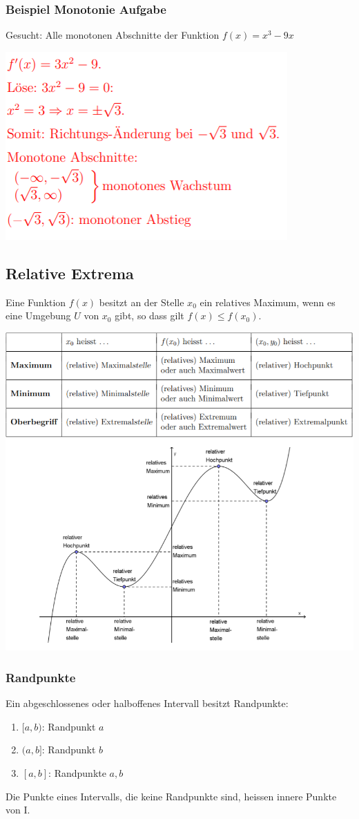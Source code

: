 \subsubsection{Beispiel Monotonie Aufgabe}
Gesucht: Alle monotonen Abschnitte der Funktion $f(x) = x^3 - 9x$
\begin{center}
    \includegraphics[width=0.4\linewidth]{images/monotonie.png}
\end{center}

\subsection{Relative Extrema}
Eine Funktion $f(x)$ besitzt an der Stelle $x_0$ ein relatives Maximum, wenn es eine Umgebung $U$ von $x_0$ gibt, so dass gilt $f(x) \leq f(x_0)$.

\begin{center}
    \includegraphics[width=1\linewidth]{images/rel.png}
\end{center}

\subsubsection{Randpunkte}
Ein abgeschlossenes oder halboffenes Intervall besitzt Randpunkte:
\begin{enumerate}
    \item $[a,b)$: Randpunkt $a$
    \item $(a,b]$: Randpunkt $b$
    \item $[a,b]$: Randpunkte $a,b$
\end{enumerate}
Die Punkte eines Intervalls, die keine Randpunkte sind, heissen innere Punkte von I.

